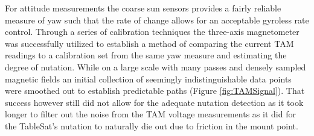 For attitude measurements the coarse sun sensors provides a fairly reliable measure of yaw such that the rate of change allows for an acceptable gyroless rate control.  Through a series of calibration techniques the three-axis magnetometer was successfully utilized to establish a method of comparing the current TAM readings to a calibration set from the same yaw measure and estimating the degree of nutation.  While on a large scale with many passes and densely sampled magnetic fields an initial collection of seemingly indistinguishable data points were smoothed out to establish predictable paths (Figure \ref{fig:TAMSignal}).  That success however still did not allow for the adequate nutation detection as it took longer to filter out the noise from the TAM voltage measurements as it did for the TableSat's nutation to naturally die out due to friction in the mount point.
